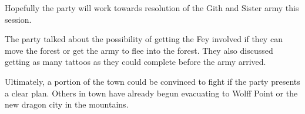 Hopefully the party will work towards resolution of the Gith and Sister army this session.

The party talked about the possibility of getting the Fey involved if they can move the forest or get the army to flee into the forest.
They also discussed getting as many tattoos as they could complete before the army arrived.

Ultimately, a portion of the town could be convinced to fight if the party presents a clear plan.
Others in town have already begun evacuating to Wolff Point or the new dragon city in the mountains.
